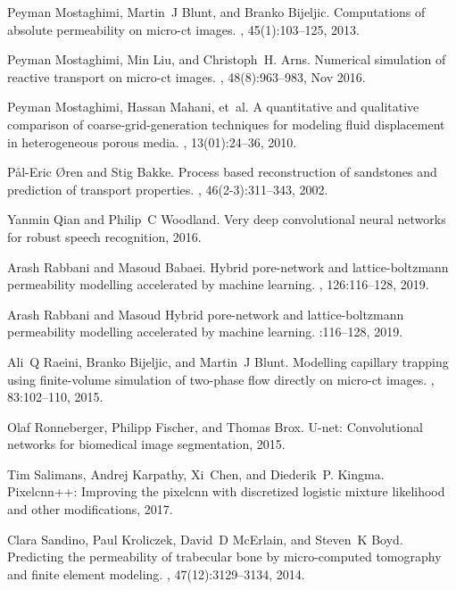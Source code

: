 \documentclass{article}
\begin{document}
\begin{thebibliography}{10}
Peyman Mostaghimi, Martin~J Blunt, and Branko Bijeljic.
\newblock Computations of absolute permeability on micro-ct images.
, 45(1):103--125, 2013.

Peyman Mostaghimi, Min Liu, and Christoph~H. Arns.
\newblock Numerical simulation of reactive transport on micro-ct images.
, 48(8):963--983, Nov 2016.

Peyman Mostaghimi, Hassan Mahani, et~al.
\newblock A quantitative and qualitative comparison of coarse-grid-generation
  techniques for modeling fluid displacement in heterogeneous porous media.
, 13(01):24--36, 2010.

P{\aa}l-Eric {\O}ren and Stig Bakke.
\newblock Process based reconstruction of sandstones and prediction of
  transport properties.
, 46(2-3):311--343, 2002.

Yanmin Qian and Philip~C Woodland.
\newblock Very deep convolutional neural networks for robust speech
  recognition, 2016.

Arash Rabbani and Masoud Babaei.
\newblock Hybrid pore-network and lattice-boltzmann permeability modelling
  accelerated by machine learning.
, 126:116--128, 2019.

Arash Rabbani and Masoud %
\newblock Hybrid pore-network and lattice-boltzmann permeability modelling
  accelerated by machine learning.
:116--128, 2019.

Ali~Q Raeini, Branko Bijeljic, and Martin~J Blunt.
\newblock Modelling capillary trapping using finite-volume simulation of
  two-phase flow directly on micro-ct images.
, 83:102--110, 2015.

Olaf Ronneberger, Philipp Fischer, and Thomas Brox.
\newblock U-net: Convolutional networks for biomedical image segmentation,
  2015.

Tim Salimans, Andrej Karpathy, Xi~Chen, and Diederik~P. Kingma.
\newblock Pixelcnn++: Improving the pixelcnn with discretized logistic mixture
  likelihood and other modifications, 2017.

Clara Sandino, Paul Kroliczek, David~D McErlain, and Steven~K Boyd.
\newblock Predicting the permeability of trabecular bone by micro-computed
  tomography and finite element modeling.
, 47(12):3129--3134, 2014.


\end{thebibliography}
\end{document}
